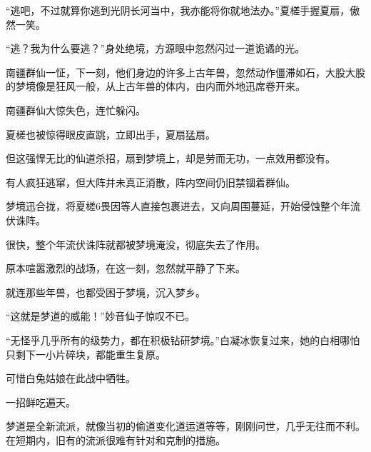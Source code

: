 \begin{this_body}
“逃吧，不过就算你逃到光阴长河当中，我亦能将你就地法办。”夏槎手握夏扇，傲然一笑。

“逃？我为什么要逃？”身处绝境，方源眼中忽然闪过一道诡谲的光。

南疆群仙一怔，下一刻，他们身边的许多上古年兽，忽然动作僵滞如石，大股大股的梦境像是狂风一般，从上古年兽的体内，由内而外地迅席卷开来。

南疆群仙大惊失色，连忙躲闪。

夏槎也被惊得眼皮直跳，立即出手，夏扇猛扇。

但这强悍无比的仙道杀招，扇到梦境上，却是劳而无功，一点效用都没有。

有人疯狂逃窜，但大阵并未真正消散，阵内空间仍旧禁锢着群仙。

梦境迅合拢，将夏槎6畏因等人直接包裹进去，又向周围蔓延，开始侵蚀整个年流伏诛阵。

很快，整个年流伏诛阵就都被梦境淹没，彻底失去了作用。

原本喧嚣激烈的战场，在这一刻，忽然就平静了下来。

就连那些年兽，也都受困于梦境，沉入梦乡。

“这就是梦道的威能！”妙音仙子惊叹不已。

“无怪乎几乎所有的级势力，都在积极钻研梦境。”白凝冰恢复过来，她的白相哪怕只剩下一小片碎块，都能重生复原。

可惜白兔姑娘在此战中牺牲。

一招鲜吃遍天。

梦道是全新流派，就像当初的偷道变化道运道等等，刚刚问世，几乎无往而不利。在短期内，旧有的流派很难有针对和克制的措施。

\end{this_body}

